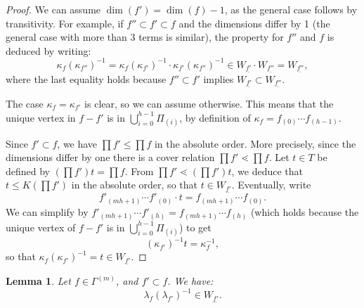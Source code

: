 \documentclass[11pt]{article}
\newtheorem{lemm}[theo]{Lemma}
\theoremstyle{definition}
\begin{document}
\begin{proof}
    We can assume $\dim(f') = \dim(f)-1$, as the general case follows by transitivity. For example, if $f''\subset f' \subset f$ and the dimensions differ by 1 (the general case with more than 3 terms is similar), the property for $f''$ and $f$ is deduced by writing:
    \[
        \kappa_f (\kappa_{f''})^{-1}
            =
        \kappa_f (\kappa_{f'})^{-1}\cdot
        \kappa_{f'}(\kappa_{f''})^{-1}
            \in
        W_{\underline{f'}}\cdot
        W_{\underline{f''}}
            =
        W_{\underline{f''}},
    \]
    where the last equality holds because $f''\subset f'$ implies $W_{\underline{f'}} \subset W_{\underline{f''}}$.  

    The case $\kappa_f = \kappa_{f'}$ is clear, so we can assume otherwise.  This means that the unique vertex in $f-f'$ is in $\bigcup_{i=0}^{h-1} \varPi_{(i)} $, by definition of $\kappa_f = f_{(0)} \cdots f_{(h-1)}$.

    Since $f'\subset f$, we have $\prod f' \leq \prod f$ in the absolute order.  More precisely, since the dimensions differ by one there is a cover relation $\prod f' \lessdot \prod f$.  Let $t\in T$ be defined by $(\prod f')t = \prod f$.  From $\prod f' \lessdot (\prod f')t$, we deduce that $t \leq K(\prod f') $ in the absolute order, so that $t \in W_{\underline{f'}}$.  Eventually, write
    \[
        f'_{(mh+1)} \cdots f'_{(0)} \cdot t
            =
        f_{(mh+1)} \cdots f_{(0)}.
    \]
    We can simplify by $f'_{(mh+1)} \cdots f'_{(h)} = f_{(mh+1)} \cdots f_{(h)} $ (which holds because the unique vertex of $f-f'$ is in $\bigcup_{i=0}^{h-1} \varPi_{(i)} $) to get 
    \[
        (\kappa_{f'})^{-1} t = \kappa_f^{-1},
    \]
    so that $\kappa_f (\kappa_{f'})^{-1} = t \in W_{\underline{f'}}$.
\end{proof}



\begin{lemm} \label{lemm_lambdalambda}
    Let $f\in\Gamma^{(m)}$, and $f'\subset f$.
    We have:
    \[
        \lambda_f (\lambda_{f'})^{-1}  
            \in
        W_{\underline{f'}}.
    \]
\end{lemm}
\end{document}
